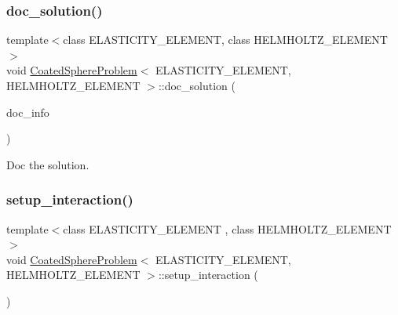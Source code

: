 \mbox{\label{classCoatedSphereProblem_aaeade2a110160c002b2b45954a5a0edc}} 
\subsubsection{\texorpdfstring{doc\+\_\+solution()}{doc\_solution()}\hspace{0.1cm}{\footnotesize\ttfamily [2/2]}}
{\footnotesize\ttfamily template$<$class E\+L\+A\+S\+T\+I\+C\+I\+T\+Y\+\_\+\+E\+L\+E\+M\+E\+NT, class H\+E\+L\+M\+H\+O\+L\+T\+Z\+\_\+\+E\+L\+E\+M\+E\+NT$>$ \\
void \hyperlink{classCoatedSphereProblem}{Coated\+Sphere\+Problem}$<$ E\+L\+A\+S\+T\+I\+C\+I\+T\+Y\+\_\+\+E\+L\+E\+M\+E\+NT, H\+E\+L\+M\+H\+O\+L\+T\+Z\+\_\+\+E\+L\+E\+M\+E\+NT $>$\+::doc\+\_\+solution (\begin{DoxyParamCaption}\item[{Doc\+Info \&}]{doc\+\_\+info }\end{DoxyParamCaption})}



Doc the solution. 

\mbox{\label{classCoatedSphereProblem_aeea43c892871a6c65df992aedc3b3547}} 
\subsubsection{\texorpdfstring{setup\+\_\+interaction()}{setup\_interaction()}\hspace{0.1cm}{\footnotesize\ttfamily [1/2]}}
{\footnotesize\ttfamily template$<$class E\+L\+A\+S\+T\+I\+C\+I\+T\+Y\+\_\+\+E\+L\+E\+M\+E\+NT , class H\+E\+L\+M\+H\+O\+L\+T\+Z\+\_\+\+E\+L\+E\+M\+E\+NT $>$ \\
void \hyperlink{classCoatedSphereProblem}{Coated\+Sphere\+Problem}$<$ E\+L\+A\+S\+T\+I\+C\+I\+T\+Y\+\_\+\+E\+L\+E\+M\+E\+NT, H\+E\+L\+M\+H\+O\+L\+T\+Z\+\_\+\+E\+L\+E\+M\+E\+NT $>$\+::setup\+\_\+interaction (\begin{DoxyParamCaption}{ }\end{DoxyParamCaption})\hspace{0.3cm}{\ttfamily [private]}}



